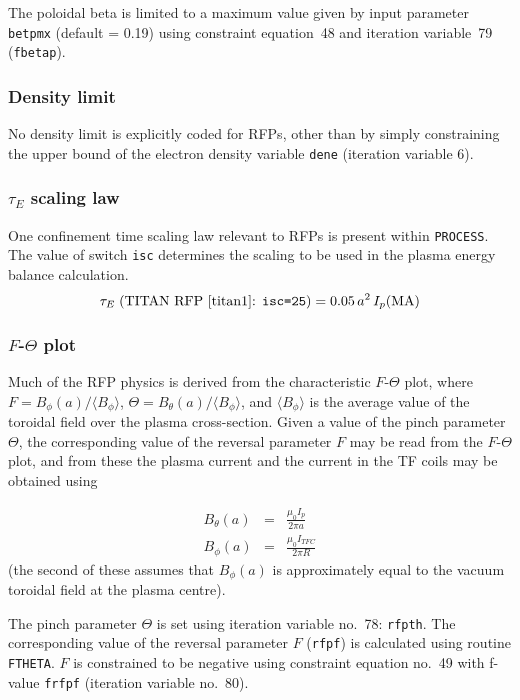\documentclass[11pt,a4paper]{report}
\newcommand{\process}{\mbox{\texttt{PROCESS}}}
\begin{document}
The poloidal beta is limited to a maximum value given by input parameter
\texttt{betpmx} (default = 0.19) using constraint equation~48 and iteration
variable~79 (\texttt{fbetap}).

\subsubsection{Density limit}

No density limit is explicitly coded for RFPs, other than by simply
constraining the upper bound of the electron density variable \texttt{dene}
(iteration variable 6).

\subsubsection{$\tau_E$ scaling law}

One confinement time scaling law relevant to RFPs is present within
\process. The value of switch \texttt{isc} determines the scaling to be used
in the plasma energy balance calculation.
\[
\tau_E\; (\mbox{TITAN RFP~\cite{titan1}: \texttt{isc=25}})
 = 0.05 \, a^2 \, I_p(\mathrm{MA})
\]

\subsubsection{$F$-$\Theta$ plot}

Much of the RFP physics is derived from the characteristic $F$-$\Theta$ plot,
where $F = B_\phi (a)/\langle B_\phi \rangle$, $\Theta = B_\theta (a)/\langle
B_\phi \rangle$, and $\langle B_\phi \rangle$ is the average value of the
toroidal field over the plasma cross-section. Given a value of the pinch
parameter $\Theta$, the corresponding value of the reversal parameter $F$ may
be read from the $F$-$\Theta$ plot, and from these the plasma current and the
current in the TF coils may be obtained using

\begin{eqnarray*}
  B_\theta (a) & = & \frac{\mu_0 I_p}{2\pi a} \\
  B_\phi (a)   & = & \frac{\mu_0 I_{TFC}}{2\pi R}
\end{eqnarray*}
(the second of these assumes that $B_\phi (a)$ is approximately equal to the
vacuum toroidal field at the plasma centre).

The pinch parameter $\Theta$ is set using iteration variable no.\ 78:
\texttt{rfpth}. The corresponding value of the reversal parameter $F$
(\texttt{rfpf}) is calculated using routine \texttt{FTHETA}. $F$ is
constrained to be negative using constraint equation no.\ 49 with f-value
\texttt{frfpf} (iteration variable no.\ 80).
\end{document}
